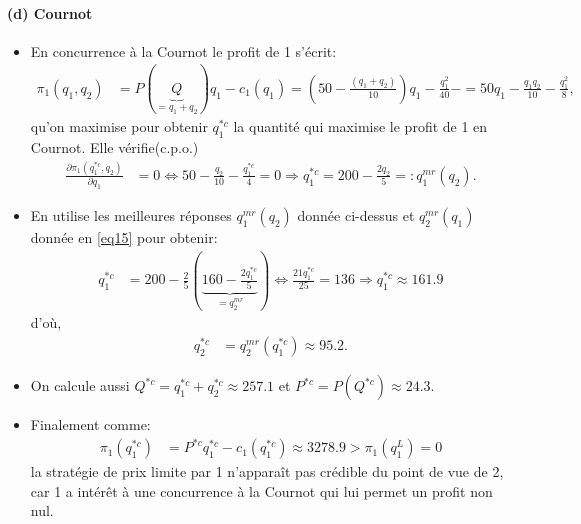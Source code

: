 \begin{frame}[allowframebreaks]{\insertsection}
\framesubtitle{(d) Cournot}
    \begin{itemize}
        \item En concurrence à la Cournot le profit de 1 s'écrit: 
        \begin{align}
            \pi_1(q_1, q_2) &= P(\underbrace{Q}_{=q_1+ q_2})q_1 - c_1(q_1) = \left(50-\frac{(q_1+q_2)}{10}\right)q_1  - \frac{q_1^2}{40}   -
            =  50 q_1 -\frac{q_1q_2}{10} - \frac{q_1^2}{8},
            \label{eq16}
        \end{align}
        qu'on maximise pour obtenir $q_1^{*c}$ la quantité qui maximise le profit de 1 en Cournot. Elle vérifie(c.p.o.)
        \begin{align}
            \frac{\partial \pi_1(q_1^{*c}, q_2)}{\partial q_1} &= 0 \Leftrightarrow 50 - \frac{q_2}{10} -  
            \frac{q_1^{*c}}{4} = 0 \Rightarrow q_1^{*c} = 200-\frac{2 q_2}{5} =: q_1^{mr}(q_2).
            \label{eq17}
        \end{align}
        \item En utilise les meilleures réponses $q_1^{mr}(q_2)$ donnée ci-dessus et $q_2^{mr}(q_1)$ donnée en \eqref{eq15} pour obtenir: 
        \begin{align*}
            q_1^{*c} &= 200-\frac{2}{5}\left( \underbrace{160 - \frac{2q_1^{*c}}{5}}_{=q_2^{mr}} \right)   
            \Leftrightarrow \frac{21q_1^{*c}}{25} = 136     \Rightarrow    q_1^{*c} \approx 161.9
         \end{align*}
         d'où, 
         \begin{align*}
            q_2^{*c} &= q_2^{mr}(q_1^{*c}) \approx 95.2.
        \end{align*}
        \item On calcule aussi $Q^{*c} = q_1^{*c} + q_2^{*c}\approx 257.1$ et $P^{*c} = P(Q^{*c}) \approx 24.3$.
        \item Finalement comme: 
        \begin{align*}
          \pi_1(q_1^{*c}) &=  P^{*c}q_1^{*c} - c_1(q_1^{*c}) \approx 3278.9 > \pi_1(q_1^L) = 0
        \end{align*}
        la stratégie de prix limite par 1 n'apparaît pas crédible du point de vue de 2, car 1 a intérêt à une
         concurrence à la Cournot qui lui permet un profit non nul. 
    \end{itemize}
\end{frame}
%
%


